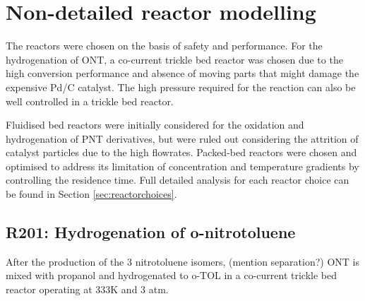 \section{Non-detailed reactor modelling} \label{Non-detailed}

The reactors were chosen on the basis of safety and performance. For the hydrogenation of ONT, a co-current trickle bed reactor was chosen due to the high conversion performance and absence of moving parts that might damage the expensive Pd/C catalyst. The high pressure required for the reaction can also be well controlled in a trickle bed reactor. 

Fluidised bed reactors were initially considered for the oxidation and hydrogenation of PNT derivatives, but were ruled out considering the attrition of catalyst particles due to the high flowrates. Packed-bed reactors were chosen and optimised to address its limitation of concentration and temperature gradients by controlling the residence time. Full detailed analysis for each reactor choice can be found in Section \ref{sec:reactorchoices}.

\begin{table}[h]
\centering
\caption{Summary of non-detailed reactors}
\label{tab:nondetailedtable}
\end{table}

\subsection{R201: Hydrogenation of o-nitrotoluene}
After the production of the 3 nitrotoluene isomers, (mention separation?) ONT is mixed with propanol and hydrogenated to o-TOL in a co-current trickle bed reactor operating at 333K and 3 atm. 

